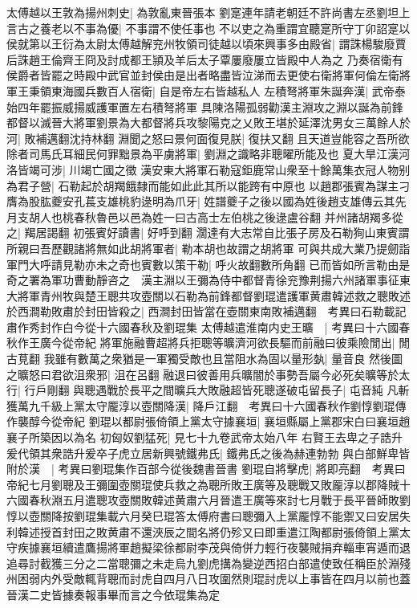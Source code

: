 太傅越以王敦為揚州刺史|{
	為敦亂東晉張本}
劉寔連年請老朝廷不許尚書左丞劉坦上言古之養老以不事為優|{
	不事謂不使任事也}
不以吏之為重謂宜聽寔所守丁卯詔寔以侯就第以王衍為太尉太傅越解兖州牧領司徒越以頃來興事多由殿省|{
	謂誅楊駿廢賈后誅趙王倫齊王冏及討成都王頴及羊后太子覃屢廢屢立皆殿中人為之}
乃奏宿衛有侯爵者皆罷之時殿中武官並封侯由是出者略盡皆泣涕而去更使右衛將軍何倫左衛將軍王秉領東海國兵數百人宿衛|{
	自是帝左右皆越私人}
左積弩將軍朱誕奔漢|{
	武帝泰始四年罷振威揚威護軍置左右積弩將軍}
具陳洛陽孤弱勸漢主淵攻之淵以誕為前鋒都督以滅晉大將軍劉景為大都督將兵攻黎陽克之乂敗王堪於延澤沈男女三萬餘人於河|{
	敗補邁翻沈持林翻}
淵聞之怒曰景何面復見朕|{
	復扶又翻}
且天道豈能容之吾所欲除者司馬氏耳細民何罪黜景為平虜將軍|{
	劉淵之識略非聰曜所能及也}
夏大旱江漢河洛皆竭可涉|{
	川竭亡國之徵}
漢安東大將軍石勒寇鉅鹿常山衆至十餘萬集衣冠人物别為君子營|{
	石勒起於胡羯餓隸而能如此此其所以能跨有中原也}
以趙郡張賓為謀主刁膺為股肱夔安孔萇支雄桃豹逯明為爪牙|{
	姓譜夔子之後以國為姓後趙支雄傳云其先月支胡人也桃春秋魯邑以邑為姓一曰古高士左伯桃之後逯盧谷翻}
并州諸胡羯多從之|{
	羯居謁翻}
初張賓好讀書|{
	好呼到翻}
濶達有大志常自比張子房及石勒狥山東賓謂所親曰吾歷觀諸將無如此胡將軍者|{
	勒本胡也故謂之胡將軍}
可與共成大業乃提劒詣軍門大呼請見勒亦未之奇也賓數以策干勒|{
	呼火故翻數所角翻}
已而皆如所言勒由是奇之署為軍功曹動靜咨之　漢主淵以王彌為侍中都督青徐兖豫荆揚六州諸軍事征東大將軍青州牧與楚王聰共攻壺關以石勒為前鋒都督劉琨遣護軍黄肅韓述救之聰敗述於西澗勒敗肅於封田皆殺之|{
	西澗封田皆當在壺關東南敗補邁翻　考異曰石勒載記肅作秀封作白今從十六國春秋及劉琨集}
太傅越遣淮南内史王曠　|{
	考異曰十六國春秋作王廣今從帝紀}
將軍施融曹超將兵拒聰等曠濟河欲長驅而前融曰彼乘險閒出|{
	閒古莧翻}
我雖有數萬之衆猶是一軍獨受敵也且當阻水為固以量形埶|{
	量音良}
然後圖之曠怒曰君欲沮衆邪|{
	沮在呂翻}
融退曰彼善用兵曠闇於事勢吾屬今必死矣曠等於太行|{
	行戶剛翻}
與聰遇戰於長平之間曠兵大敗融超皆死聰遂破屯留長子|{
	屯音純}
凡斬獲萬九千級上黨太守龎淳以壺關降漢|{
	降戶江翻　考異曰十六國春秋作劉惇劉琨傳作襲醇今從帝紀}
劉琨以都尉張倚領上黨太守據襄垣|{
	襄垣縣屬上黨郡宋白曰襄垣趙襄子所築因以為名}
初匈奴劉猛死|{
	見七十九卷武帝太始八年}
右賢王去卑之子誥升爰代領其衆誥升爰卒子虎立居新興號鐵弗氏|{
	鐵弗氏之後為赫連勃勃}
與白部鮮卑皆附於漢　|{
	考異曰劉琨集作百部今從後魏書晉書}
劉琨自將擊虎|{
	將即亮翻　考異曰帝紀七月劉聰及王彌圍壺關琨使兵救之為聰所敗王廣等及聰戰又敗龎淳以郡降賊十六國春秋淵五月遣聰攻壺關敗韓述黄肅六月晉遣王廣等來討七月戰于長平晉師敗劉惇以壺關降按劉琨集載六月癸巳琨答太傅府書曰聰彌入上黨龎惇不能禦又曰安居失利韓述授首封田之敗黄肅不還浹辰之間名將仍殄又曰即重遣江陶都尉張倚領上黨太守疾據襄垣續遣鷹揚將軍趙擬梁徐都尉李茂與倚併力輕行夜襲賊捐弃輜車宵遁而退追尋討截獲三分之二當聰彌之未走烏九劉虎搆為變逆西招白部遣使致任稱臣於淵殘州困弱内外受敵輒背聰而討虎自四月八日攻圍然則琨討虎以上事皆在四月以前也蓋晉漢二史皆據奏報事畢而言之今依琨集為定}
